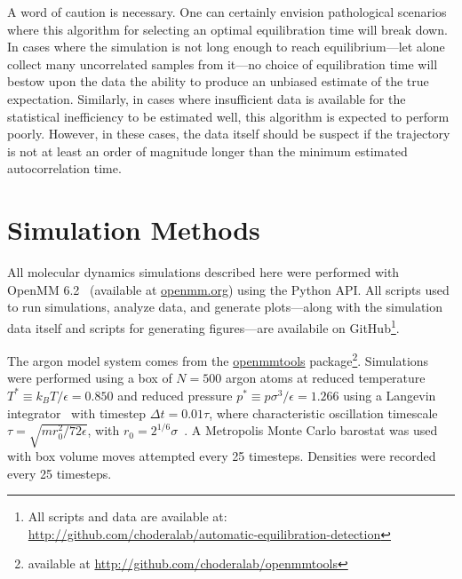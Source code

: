 \documentclass[aps,pre,twocolumn,nofootinbib,superscriptaddress,linenumbers,11point]{revtex4-1}
\begin{document}
A word of caution is necessary.
One can certainly envision pathological scenarios where this algorithm for selecting an optimal equilibration time will break down.
In cases where the simulation is not long enough to reach equilibrium---let alone collect many uncorrelated samples from it---no choice of equilibration time will bestow upon the data the ability to produce an unbiased estimate of the true expectation.
Similarly, in cases where insufficient data is available for the statistical inefficiency to be estimated well, this algorithm is expected to perform poorly.
However, in these cases, the data itself should be suspect if the trajectory is not at least an order of magnitude longer than the minimum estimated autocorrelation time.


\section*{Simulation Methods}
\label{section:methods}

All molecular dynamics simulations described here were performed with OpenMM 6.2~\cite{eastman:jctc:2012:openmm} (available at \href{http://openmm.org}{openmm.org}) using the Python API.
All scripts used to run simulations, analyze data, and generate plots---along with the simulation data itself and scripts for generating figures---are availabile on GitHub\footnote{All scripts and data are available at:\\
\url{http://github.com/choderalab/automatic-equilibration-detection}}.

The argon model system comes from the \href{http://github.com/choderalab/openmmtools}{openmmtools} package\footnote{available at \url{http://github.com/choderalab/openmmtools}}.
Simulations were performed using a box of $N = 500$ argon atoms at reduced temperature $T^* \equiv k_B T / \epsilon = 0.850$ and reduced pressure $p^* \equiv p \sigma^3 / \epsilon = 1.266$ using a Langevin integrator~\cite{sivak-chodera-crooks:jpcb:2014:vvvr} with timestep $\Delta t = 0.01 \tau$, where characteristic oscillation timescale $\tau = \sqrt{m r_0^2 / 72 \epsilon}$, with $r_0 = 2^{1/6} \sigma$~\cite{liquid-argon-characteristic-timescale}.
A Metropolis Monte Carlo barostat was used with box volume moves attempted every 25 timesteps.
Densities were recorded every 25 timesteps.
\end{document}
